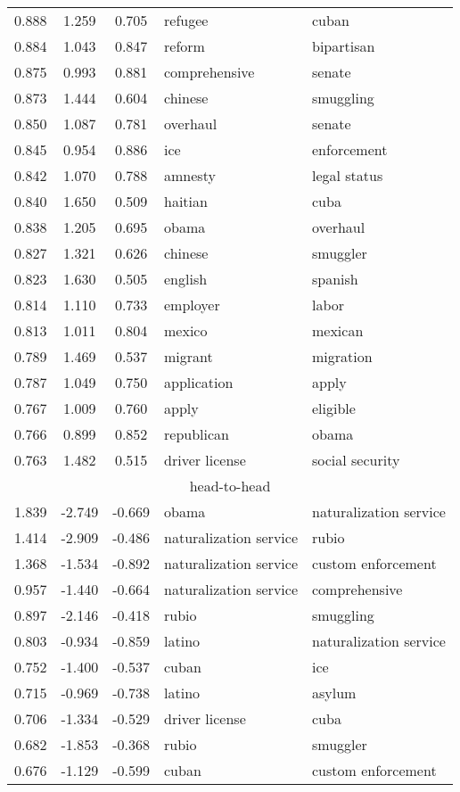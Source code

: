\begin{tabular}{cccp{5cm}p{5cm}}
0.888 & 1.259 & 0.705 & refugee & cuban \\
0.884 & 1.043 & 0.847 & reform & bipartisan \\
0.875 & 0.993 & 0.881 & comprehensive & senate \\
0.873 & 1.444 & 0.604 & chinese & smuggling \\
0.850 & 1.087 & 0.781 & overhaul & senate \\
0.845 & 0.954 & 0.886 & ice & enforcement \\
0.842 & 1.070 & 0.788 & amnesty & legal status \\
0.840 & 1.650 & 0.509 & haitian & cuba \\
0.838 & 1.205 & 0.695 & obama & overhaul \\
0.827 & 1.321 & 0.626 & chinese & smuggler \\
0.823 & 1.630 & 0.505 & english & spanish \\
0.814 & 1.110 & 0.733 & employer & labor \\
0.813 & 1.011 & 0.804 & mexico & mexican \\
0.789 & 1.469 & 0.537 & migrant & migration \\
0.787 & 1.049 & 0.750 & application & apply \\
0.767 & 1.009 & 0.760 & apply & eligible \\
0.766 & 0.899 & 0.852 & republican & obama \\
0.763 & 1.482 & 0.515 & driver license & social security \\
\midrule
\multicolumn{5}{c}{head-to-head}\\
1.839 & -2.749 & -0.669 & obama & naturalization service \\
1.414 & -2.909 & -0.486 & naturalization service & rubio \\
1.368 & -1.534 & -0.892 & naturalization service & custom enforcement \\
0.957 & -1.440 & -0.664 & naturalization service & comprehensive \\
0.897 & -2.146 & -0.418 & rubio & smuggling \\
0.803 & -0.934 & -0.859 & latino & naturalization service \\
0.752 & -1.400 & -0.537 & cuban & ice \\
0.715 & -0.969 & -0.738 & latino & asylum \\
0.706 & -1.334 & -0.529 & driver license & cuba \\
0.682 & -1.853 & -0.368 & rubio & smuggler \\
0.676 & -1.129 & -0.599 & cuban & custom enforcement \\

\end{tabular}
